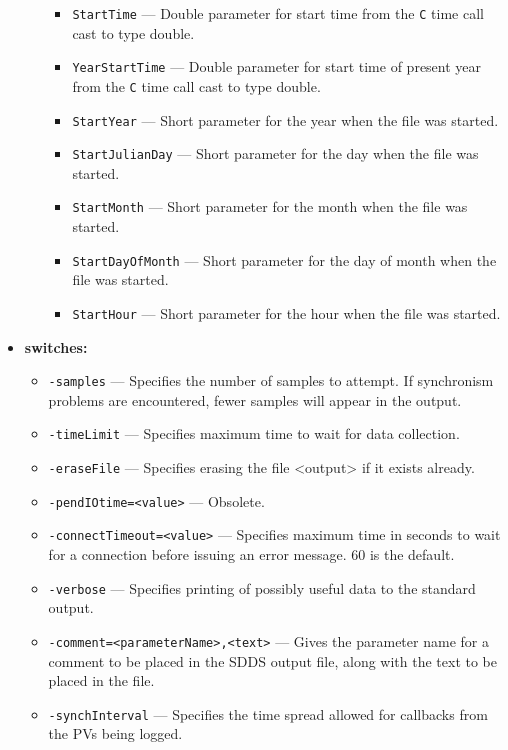 \begin{itemize}
\begin{itemize}
\begin{itemize}
        \item {\tt StartTime} --- Double parameter for start time from the {\tt C} time call cast to type double.
        \item {\tt YearStartTime} --- Double parameter for start time of present year from the {\tt C} time call cast to type double.
        \item {\verb+StartYear+} --- Short parameter for the year when the file was started.
        \item {\verb+StartJulianDay+} --- Short parameter for the day when the file was started.
        \item {\verb+StartMonth+} --- Short parameter for the month when the file was started.
        \item {\verb+StartDayOfMonth+} --- Short parameter for the day of month when the file was started.
        \item {\verb+StartHour+} --- Short parameter for the hour when the file was started.
\end{itemize}
\end{itemize}
%
\item {\bf switches:}
%
%
    \begin{itemize}
%
        \item {\tt -samples} --- Specifies the number of samples to attempt.  If synchronism problems
                are encountered, fewer samples will appear in the output.
        \item {\tt -timeLimit} --- Specifies maximum time to wait for data collection.
        \item {\tt -eraseFile} --- Specifies erasing the file <output> if it exists already.
        \item {\tt -pendIOtime=<value>} --- Obsolete.
        \item {\tt -connectTimeout=<value>} --- Specifies maximum time in seconds to wait for a connection before
                issuing an error message. 60 is the default.
        \item {\tt -verbose} --- Specifies printing of possibly useful data to the standard output.
        \item {\verb+-comment=<parameterName>,<text>+} ---
                Gives the parameter name for a comment to be placed in the SDDS output file,
                along with the text to be placed in the file.
        \item {\tt -synchInterval} --- Specifies the time spread allowed for callbacks from the PVs being logged.

\end{itemize}
\end{itemize}
